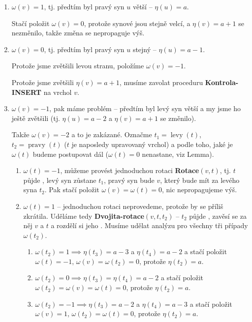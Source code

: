 \documentclass[a4paper,12pt]{article}
\DeclareMathOperator*{\levy}{levy}
\DeclareMathOperator*{\pravy}{pravy}
\begin{document}
\begin{enumerate}
\item $\omega (v)=1$, tj. předtím byl pravý syn $u$ větší -- $\eta (u)=a$.

Stačí položit $\omega (v)=0$, protože synové jsou stejně velcí, a $\eta (v)=a+1$ se nezměnilo, takže změna se nepropaguje výš.

\item $\omega (v)=0$, tj. předtím byl pravý syn $u$ stejný -- $\eta (u)=a -1$.

Protože jsme zvětšili levou stranu, položíme $\omega (v)=-1$.

Protože jsme zvětšili $\eta (v)=a+1$, musíme zavolat proceduru 
{\bf Kontrola-INSERT} na vrchol $v$.

\item $\omega (v)=-1$, pak máme problém -- předtím byl levý syn větší a my jsme ho ještě zvětšili (tj. $\eta (u)=a-2$ a $\eta (v)=a+1$ se změnilo).

Takže $\omega (v)=-2$ a to je zakázané. Označme $t_1=\levy
(t)$, 
$t_2=\pravy(t)$ ($t$ je naposledy upravovaný vrchol) a podle toho, jaké je $\omega (t)$ budeme postupovat dál ($\omega (t)=0$ nenastane, viz Lemma). 

\begin{enumerate}
   \item $\omega (t)=-1$, můžeme provést jednoduchou rotaci {\bf Rotace$(v,t)$}, tj. $t$ půjde , levý syn zůstane $t_1$, pravý syn bude $v$, který bude mít za levého syna $t_2$. Pak stačí položit 
    $\omega (v)=\omega (t)=0$, nic nepropagujeme výš.
    
    \item $\omega (t)=1$ -- jednoduchou rotaci neprovedeme, protože by se  příliš zkrátila. Uděláme tedy {\bf Dvojita-rotace$(v,t,t_2)$} -- $t_2$ půjde , zavěsí se za něj $v$ a $t$ a rozdělí si jeho . Musíme udělat analýzu pro všechny tři případy $\omega (t_2)$.
    \begin{enumerate}
        \item $\omega (t_2)=1\implies\eta (t_3)=a-3$ a $\eta (t_4)=a-2$ a stačí 
        položit $\omega (t)=-1$, $\omega (v)=\omega (t_2)=0$, protože $
        \eta (t_2)=a$.
        \item  $\omega (t_2)=0\implies\eta (t_3)=\eta (t_4)=a-2$ a stačí položit 
        $\omega (t_2)=\omega (v)=\omega (t)=0$, protože $\eta (t_2)=a$.
        \item $\omega (t_2)=-1\implies\eta (t_3)=a-2$ a $\eta (t_4)=a-3$ a 
        stačí položit $\omega (v)=1$, $\omega (t_2)=\omega (t)=
        0$, protože $\eta (t_2)=a$.
    \end{enumerate}
\end{enumerate}
\end{enumerate}
\end{document}
